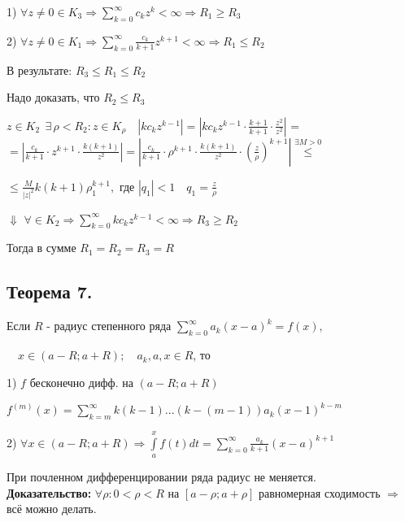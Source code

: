 \documentclass[a4paper,12pt]{article} %
\begin{document}
    1) $\forall z \neq 0 \in K_3 \Rightarrow \sum\limits_{k = 0}^\infty c_k z^k < \infty \Rightarrow R_1 \geqslant R_3$
    
    2) $\forall z \neq 0 \in K_1 \Rightarrow \sum\limits_{k = 0}^\infty \frac{c_k}{k + 1} z^{k+1} < \infty \Rightarrow R_1 \leqslant R_2$
    
    В результате: $R_3 \leqslant R_1 \leqslant R_2 $

    Надо доказать, что $R_2 \leqslant R_3$

    $z \in K_2 \ \  \exists \, \rho < R_2: z \in K_{\rho} \quad |k c_k z^{k - 1}| = |k c_k z^{k - 1} \cdot \frac{k + 1}{k + 1} \cdot \frac{z^2}{z^2}|$ = 
    $= |\frac{c_k}{k + 1} \cdot z^{k + 1} \cdot \frac{k(k+1)}{z^2}| = | \frac{c_k}{k + 1} \cdot \rho^{k + 1} \cdot \frac{k(k + 1)}{z^2} \cdot \left( \frac{z}{\rho} \right)^{k + 1}| \stackrel{\exists M > 0}{\leqslant} $
    
    $\leqslant \frac{M}{|z|^2} k(k+1) \rho_1^{k + 1}, \text{ где } |q_1| < 1 \quad q_1 = \frac{z}{\rho}$
    
    \hspace*{3 cm} $\Downarrow$
    $\forall \in K_2 \Rightarrow \sum\limits_{k = 0}^\infty k c_k z^{k - 1} < \infty \Rightarrow R_3 \geqslant R_2$
    
    Тогда в сумме $R_1 = R_2 = R_3 = R$
    
      \subsection{Теорема 7.}
      Если $R$ - радиус степенного ряда $\sum\limits_{k = 0}^\infty a_k (x - a)^k = f(x), $
      
      $
      \quad x \in (a - R; a + R); \quad a_k, a, x \in R$, то
      
      1) $f$  бесконечно дифф. на $(a - R; a + R)$
      
      $f^{(m)}(x) = \sum\limits_{k = m}^\infty k(k-1) ... (k - (m - 1)) a_k (x - 1)^{k - m}$
      
      2) $\forall x \in (a - R; a + R) \Rightarrow \int\limits_{a}^{x} f(t) dt = \sum\limits_{k = 0}^\infty \frac{a_k}{k + 1} (x - a)^{k + 1}$ 

      При почленном дифференцировании ряда радиус не меняется.\\
      
      \textbf{Доказательство:}
      $\forall \rho: 0 < \rho < R  \text{ на } [a - \rho; a + \rho ]$ равномерная сходимость $\Rightarrow$ всё можно делать.\\
\end{document}
